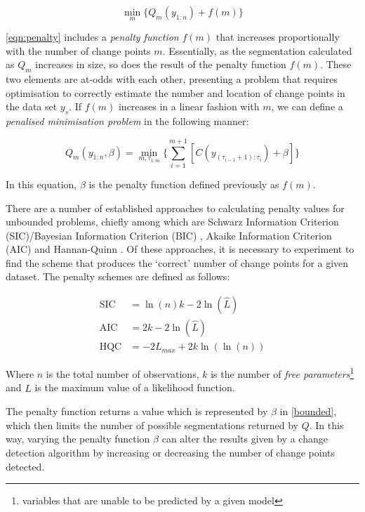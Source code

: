 \documentclass[../main.tex]{subfiles}
\begin{document}
\begin{equation}
\label{eqn:penalty}
    \min_{m} \big\{ Q_m(y_{1:n}) + f(m) \big\}
\end{equation}

\autoref{eqn:penalty} includes a \emph{penalty function} $f(m)$ that increases proportionally with the number of change points $m$. Essentially, as the segmentation calculated as $Q_m$ increases in size, so does the result of the penalty function $f(m)$. These two elements are at-odds with each other, presenting a problem that requires optimisation to correctly estimate the number and location of change points in the data set $y_s$. If $f(m)$ increases in a linear fashion with $m$, we can define a \emph{penalised minimisation problem} in the following manner:

\begin{equation}
\label{bounded}
    Q_m(y_{1:n}, \beta) = \min_{m,\tau_{1:m}} \Bigg\{ \sum^{m+1}_{i=1}[C(y_{(\tau_{i - 1} + 1):\tau_i}) + \beta] \Bigg\}
\end{equation}

In this equation, $\beta$ is the penalty function defined previously as $f(m)$.

There are a number of established approaches to calculating penalty values for unbounded problems, chiefly among which are Schwarz Information Criterion (SIC)/Bayesian Information Criterion (BIC) \cite{Schwarz1978}, Akaike Information Criterion (AIC) \cite{Akaike1974} and Hannan-Quinn \cite{Journal2009}. Of these approaches, it is necessary to experiment to find the scheme that produces the `correct' number of change points for a given dataset. The penalty schemes are defined as follows:

\begin{align}
    \text{SIC} &= \ln(n) k - 2 \ln(\hat{L})\\
    \text{AIC} &= 2k - 2 \ln(\hat{L})\\
    \text{HQC} &= -2L_{max} + 2k \ln(\ln(n))
\end{align}

Where $n$ is the total number of observations, $k$ is the number of \emph{free parameters}\footnote{variables that are unable to be predicted by a given model} and $\hat{L}$ is the maximum value of a likelihood function.

The penalty function returns a value which is represented by $\beta$ in \autoref{bounded}, which then limits the number of possible segmentations returned by $Q$. In this way, varying the penalty function $\beta$ can alter the results given by a change detection algorithm by increasing or decreasing the number of change points detected.
\end{document}
